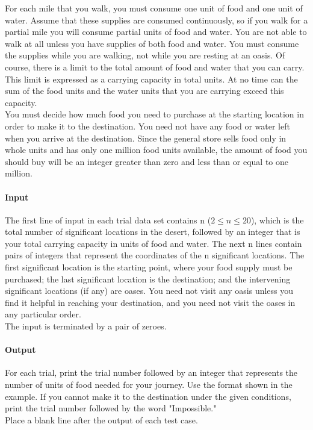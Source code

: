 \documentclass{book}
\begin{document}
\begin{enumerate}
\begin{enumerate}
		For each mile that you walk, you must consume one unit of food and one unit of water. Assume that these supplies are consumed continuously, so if you walk for a partial mile you will consume partial units of food and water. You are not able to walk at all unless you have supplies of both food and water. You must consume the supplies while you are walking, not while you are resting at an oasis. Of course, there is a limit to the total amount of food and water that you can carry. This limit is expressed as a carrying capacity in total units. At no time can the sum of the food units and the water units that you are carrying exceed this capacity. \\
		You must decide how much food you need to purchase at the starting location in order to make it to the destination. You need not have any food or water left when you arrive at the destination. Since the general store sells food only in whole units and has only one million food units available, the amount of food you should buy will be an integer greater than zero and less than or equal to one million. 
		\paragraph{Input}
		The first line of input in each trial data set contains n ($2 \le n \le 20$), which is the total number of significant locations in the desert, followed by an integer that is your total carrying capacity in units of food and water. The next n lines contain pairs of integers that represent the coordinates of the n significant locations. The first significant location is the starting point, where your food supply must be purchased; the last significant location is the destination; and the intervening significant locations (if any) are oases. You need not visit any oasis unless you find it helpful in reaching your destination, and you need not visit the oases in any particular order. \\
		The input is terminated by a pair of zeroes.
		\paragraph{Output}
		For each trial, print the trial number followed by an integer that represents the number of units of food needed for your journey. Use the format shown in the example. If you cannot make it to the destination under the given conditions, print the trial number followed by the word "Impossible."\\
		Place a blank line after the output of each test case.

\end{enumerate}
\end{enumerate}
\end{document}
